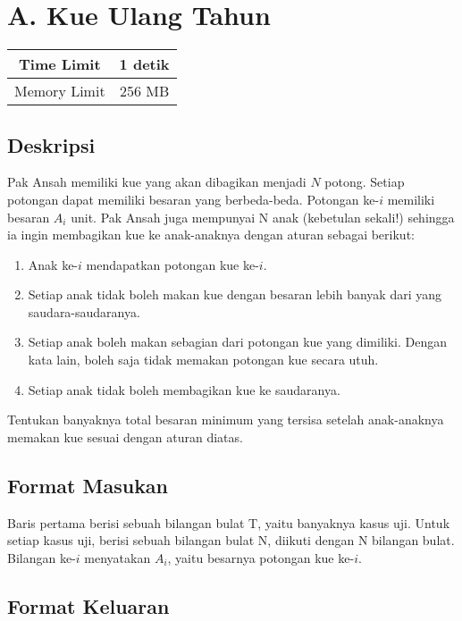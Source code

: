 \documentclass{article}
\begin{document}
\section*{\hfil A. Kue Ulang Tahun\hfil}

\begin{center}
\begin{tabular}{ |cc| } 
 \hline
 Time Limit & 1 detik \\
 \hline 
 Memory Limit & 256 MB \\
 \hline
\end{tabular}
\end{center}

\subsection*{Deskripsi}
\par Pak Ansah memiliki kue yang akan dibagikan menjadi $N$ potong. Setiap potongan dapat memiliki besaran yang berbeda-beda. Potongan ke-$i$ memiliki besaran $A_i$ unit. Pak Ansah juga mempunyai N anak (kebetulan sekali!) sehingga ia ingin membagikan kue ke anak-anaknya dengan aturan sebagai berikut:

\begin{enumerate}
\item Anak ke-$i$ mendapatkan potongan kue ke-$i$.
\item Setiap anak tidak boleh makan kue dengan besaran lebih banyak dari yang saudara-saudaranya.
\item Setiap anak boleh makan sebagian dari potongan kue yang dimiliki. Dengan kata lain, boleh saja tidak memakan potongan kue secara utuh. 
\item Setiap anak tidak boleh membagikan kue ke saudaranya. 
\end{enumerate}
Tentukan banyaknya total besaran minimum yang tersisa setelah anak-anaknya memakan kue sesuai dengan aturan diatas.

\subsection*{Format Masukan}
Baris pertama berisi sebuah bilangan bulat T, yaitu banyaknya kasus uji. \newline
Untuk setiap kasus uji, berisi sebuah bilangan bulat N, diikuti dengan N bilangan bulat. Bilangan ke-$i$ menyatakan $A_i$, yaitu besarnya potongan kue ke-$i$. 

\subsection*{Format Keluaran}
\end{document}
